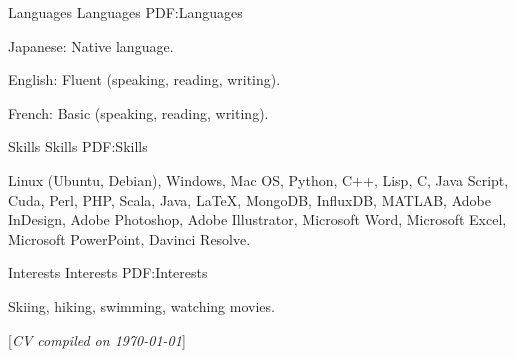 \documentclass[letterpaper,MMMyyyy,nonstopmode]{simpleresumecv}
\newcommand{\CVNote}{CV compiled on {\today}}
\begin{document}
\begin{Body}
\Section
{Languages}
{Languages}
{PDF:Languages}

\BulletItem
Japanese: Native language.

\Gap
\BulletItem
English: Fluent (speaking, reading, writing).

\Gap
\BulletItem
French: Basic (speaking, reading, writing).


\Section
{Skills}
{Skills}
{PDF:Skills}

\Entry
Linux (Ubuntu, Debian),
Windows,
Mac OS,
Python,
C++,
Lisp,
C,
Java Script,
Cuda,
Perl,
PHP,
Scala,
Java,
{\LaTeX},
MongoDB,
InfluxDB,
MATLAB,
Adobe InDesign,
Adobe Photoshop,
Adobe Illustrator,
Microsoft Word,
Microsoft Excel,
Microsoft PowerPoint,
Davinci Resolve.


\Section
{Interests}
{Interests}
{PDF:Interests}

\Entry
Skiing,
hiking,
swimming,
watching movies.

\end{Body}


\BigGap
\UseNoteFont%
\null\hfill%
[\textit{\CVNote}]
\end{document}
